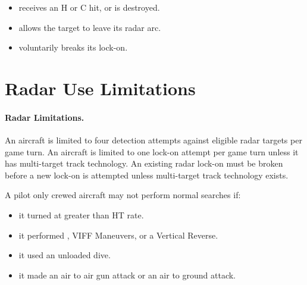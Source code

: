{\begin{itemize}
    \item receives an H or C hit, or is destroyed.

    \item allows the target to leave its radar arc.

    \item voluntarily breaks its lock-on.

\end{itemize}


\section{Radar Use Limitations}

\paragraph{Radar Limitations.} An aircraft is limited to four detection attempts against eligible radar targets per game turn. An aircraft is limited to one lock-on attempt per game turn unless it has multi-target track technology. An existing radar lock-on must be broken before a new lock-on is attempted unless multi-target track technology exists.

A pilot only crewed aircraft may not perform normal searches if:

\begin{itemize}

    \item it turned at greater than HT rate.

    \item it performed , VIFF Maneuvers, or a Vertical Reverse.

    \item it used an unloaded dive.

    \item it made an air to air gun  attack or an air to ground attack.


\end{itemize}}
